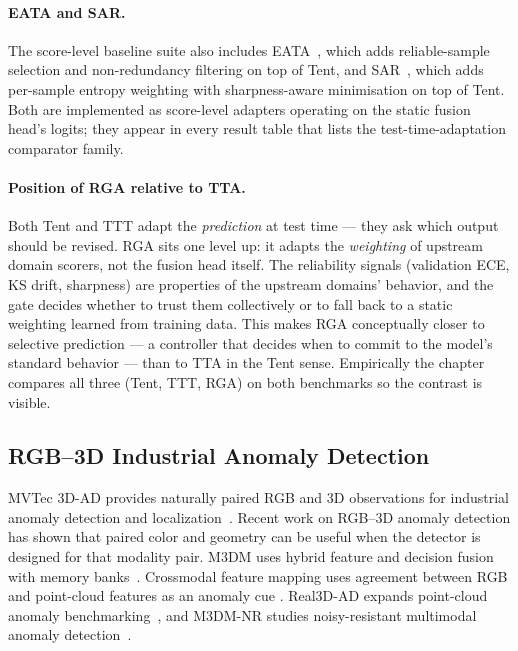 \documentclass[11pt]{article}
\newcommand{\method}{RGA}
\begin{document}
\paragraph{EATA and SAR.} The score-level baseline suite also
includes EATA~\cite{niu2022efficient}, which adds reliable-sample
selection and non-redundancy filtering on top of Tent, and
SAR~\cite{yang2023sar}, which adds per-sample entropy weighting with
sharpness-aware minimisation on top of Tent. Both are implemented as
score-level adapters operating on the static fusion head's logits;
they appear in every result table that lists the
test-time-adaptation comparator family.

\paragraph{Position of \method{} relative to TTA.} Both Tent and TTT
adapt the \emph{prediction} at test time --- they ask which output should
be revised. \method{} sits one level up: it adapts the \emph{weighting}
of upstream domain scorers, not the fusion head itself. The reliability
signals (validation ECE, KS drift, sharpness) are properties of the
upstream domains' behavior, and the gate decides whether to trust them
collectively or to fall back to a static weighting learned from training
data. This makes \method{} conceptually closer to selective prediction
\cite{geifman2017selective} --- a controller that decides when to commit
to the model's standard behavior --- than to TTA in the Tent sense.
Empirically the chapter compares all three (Tent, TTT, \method{}) on
both benchmarks so the contrast is visible.

\subsection{RGB--3D Industrial Anomaly Detection}

MVTec 3D-AD provides naturally paired RGB and 3D observations for industrial
anomaly detection and localization~\cite{bergmann2022mvtec3d}. Recent work on
RGB--3D anomaly detection has shown that paired color and geometry can be useful
when the detector is designed for that modality pair. M3DM uses hybrid feature
and decision fusion with memory banks~\cite{wang2023m3dm}. Crossmodal feature
mapping uses agreement between RGB and point-cloud features as an anomaly cue
\cite{costanzino2023crossmodal}. Real3D-AD expands point-cloud anomaly
benchmarking~\cite{liu2023real3dad}, and M3DM-NR studies noisy-resistant
multimodal anomaly detection~\cite{wang2024m3dmnr}.
\end{document}
